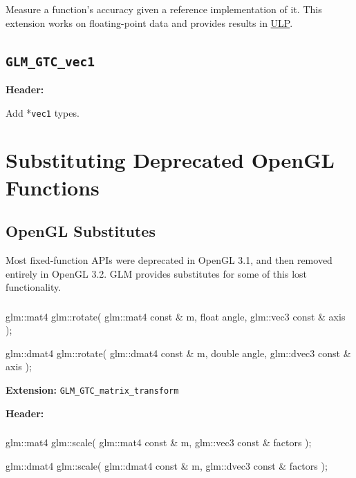 \documentclass{scrartcl}
\numberwithin{figure}{subsection}
\begin{document}
Measure a function's accuracy given a reference implementation of it. This extension works on floating-point data and provides results in \href{http://ljk.imag.fr/membres/Carine.Lucas/TPScilab/JMMuller/ulp-toms.pdf}{ULP}.

\subsection{\texttt{GLM\_GTC\_vec1}}
\textbf{Header:} 

Add *\verb|vec1| types.

\newpage{}

\section{Substituting Deprecated OpenGL Functions}

\subsection{OpenGL Substitutes}

Most fixed-function APIs were deprecated in OpenGL 3.1, and then removed entirely in OpenGL 3.2.  GLM provides substitutes for some of this lost functionality.

\subsubsection{}

\begin{cppcode}
glm::mat4 glm::rotate(
  glm::mat4 const & m,
  float angle, 
  glm::vec3 const & axis
);

glm::dmat4 glm::rotate(
  glm::dmat4 const & m,
  double angle, 
  glm::dvec3 const & axis
);
\end{cppcode}

\textbf{Extension:} \verb|GLM_GTC_matrix_transform|

\textbf{Header:} 


\subsubsection{}

\begin{cppcode}
glm::mat4 glm::scale(
  glm::mat4 const & m,
  glm::vec3 const & factors
);

glm::dmat4 glm::scale(
  glm::dmat4 const & m, 
  glm::dvec3 const & factors
);
\end{cppcode}
\end{document}
